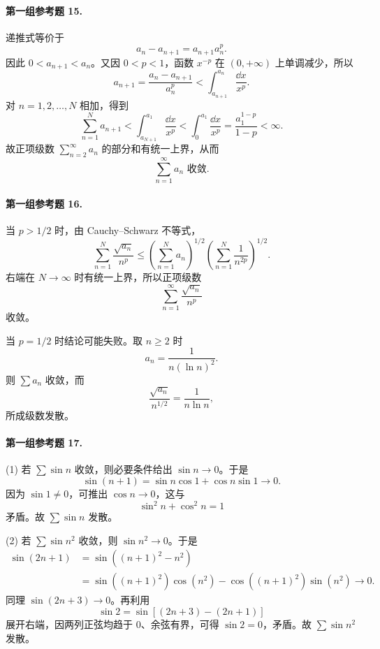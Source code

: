 \paragraph{第一组参考题 15.}
\begin{xsolution}
递推式等价于
\[
 a_n-a_{n+1}=a_{n+1}a_n^p.
\]
因此 $0<a_{n+1}<a_n$。又因 $0<p<1$，函数 $x^{-p}$ 在 $(0,+\infty)$ 上单调减少，所以
\[
 a_{n+1}
 =\frac{a_n-a_{n+1}}{a_n^p}
 <\int_{a_{n+1}}^{a_n}\frac{\dd x}{x^p}.
\]
对 $n=1,2,\ldots,N$ 相加，得到
\[
 \sum_{n=1}^{N}a_{n+1}
 <\int_{a_{N+1}}^{a_1}\frac{\dd x}{x^p}
 <\int_0^{a_1}\frac{\dd x}{x^p}
 =\frac{a_1^{1-p}}{1-p}<\infty.
\]
故正项级数 $\sum_{n=2}^{\infty}a_n$ 的部分和有统一上界，从而
\[
 \boxed{\sum_{n=1}^{\infty}a_n\text{ 收敛}.}
\]
\end{xsolution}

\paragraph{第一组参考题 16.}
\begin{xsolution}
当 $p>1/2$ 时，由 Cauchy--Schwarz 不等式，
\[
 \sum_{n=1}^{N}\frac{\sqrt{a_n}}{n^p}
 \leq
 \left(\sum_{n=1}^{N}a_n\right)^{1/2}
 \left(\sum_{n=1}^{N}\frac1{n^{2p}}\right)^{1/2}.
\]
右端在 $N\to\infty$ 时有统一上界，所以正项级数
\[
 \sum_{n=1}^{\infty}\frac{\sqrt{a_n}}{n^p}
\]
收敛。

当 $p=1/2$ 时结论可能失败。取 $n\geq2$ 时
\[
 a_n=\frac1{n(\ln n)^2}.
\]
则 $\sum a_n$ 收敛，而
\[
 \frac{\sqrt{a_n}}{n^{1/2}}=\frac1{n\ln n},
\]
所成级数发散。
\end{xsolution}

\paragraph{第一组参考题 17.}
\begin{xsolution}
(1) 若 $\sum\sin n$ 收敛，则必要条件给出 $\sin n\to0$。于是
\[
 \sin(n+1)=\sin n\cos1+\cos n\sin1\to0.
\]
因为 $\sin1\neq0$，可推出 $\cos n\to0$，这与
\[
 \sin^2n+\cos^2n=1
\]
矛盾。故 $\sum\sin n$ 发散。

(2) 若 $\sum\sin n^2$ 收敛，则 $\sin n^2\to0$。于是
\[
 \begin{aligned}
 \sin(2n+1)
 &=\sin((n+1)^2-n^2)\\
 &=\sin((n+1)^2)\cos(n^2)-\cos((n+1)^2)\sin(n^2)\to0.
\end{aligned}
\]
同理 $\sin(2n+3)\to0$。再利用
\[
 \sin2
 =\sin[(2n+3)-(2n+1)]
\]
展开右端，因两列正弦均趋于 $0$、余弦有界，可得 $\sin2=0$，矛盾。故 $\sum\sin n^2$ 发散。
\end{xsolution}

